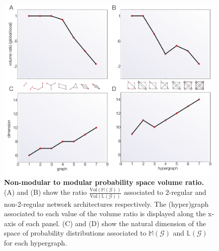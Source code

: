 \begin{figure}[!ht]
\label{fig:conediagram}
\end{figure}


\begin{figure}[!ht]
\centering
\noindent\includegraphics[width=0.9\columnwidth]{fig/figure_graphs_dims_nolines.pdf}
\caption{{\bf Non-modular to modular probability space volume ratio.} (A) and (B) show the ratio $\frac{\text{Vol}(\mathbb{M}(\mathcal{G}))}{\text{Vol}(\mathbb{L}(\mathcal{G}))}$ associated to 2-regular and non-2-regular network architectures respectively. The (hyper)graph associated to each value of the volume ratio is displayed along the x-axis of each panel. (C) and (D) show the natural dimension of the space of probability distributions associated to $\mathbb{M}(\mathcal{G})$ and $\mathbb{L}(\mathcal{G})$ for each hypergraph.}
\label{fig:ncycvolrat}
\end{figure}

